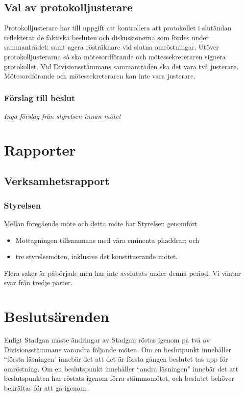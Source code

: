\documentclass[protokoll]{dvd}
\begin{document}
\subsection{Val av protokolljusterare}

Protokolljusterare har till uppgift att kontrollera att protokollet i slutändan reflekterar de faktiska besluten och diskussionerna som fördes under sammanträdet; samt agera rösträknare vid slutna omröstningar.
Utöver protokolljusterarna så ska mötesordförande och mötessekreteraren signera protokollet.
Vid Divisionsstämmans sammanträden ska det vara två justerare.
Mötesordförande och mötessekreteraren kan inte vara justerare.

\subsubsection*{Förslag till beslut}

\emph{Inga förslag från styrelsen innan mötet}

\newpage
\section{Rapporter}

\subsection{Verksamhetsrapport}

\subsubsection{Styrelsen}

Mellan föregående möte och detta möte har Styrelsen genomfört

\begin{itemize}
	\item Mottagningen tillsammans med våra eminenta phaddrar; och
	\item tre styrelsemöten, inklusive det konstituerande mötet.
\end{itemize}

Flera saker är påbörjade men har inte avslutats under denna period.
Vi väntar svar från tredje parter.

\newpage
\section{Beslutsärenden}

Enligt Stadgan måste ändringar av Stadgan röstas igenom på två av Divisionsstämmans varandra följande möten.
Om en beslutpunkt innehåller ``första läsningen' innebär det att det är första gången beslutet tas upp för omröstning.
Om en beslutspunkt innehåller ``andra läsningen'' innebär det att beslutspunkten har röstats igenom förra stämmomötet, och beslutet behöver bekräftas för att gå igenom. 
\end{document}
